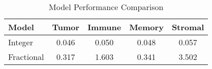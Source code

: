 \begin{table}[h!]
\centering
\caption{Model Performance Comparison}
\label{tab:performance}
\begin{tabular}{|l|c|c|c|c|}
\hline
Model & Tumor & Immune & Memory & Stromal \\
\hline
Integer & 0.046 & 0.050 & 0.048 & 0.057 \\
Fractional & 0.317 & 1.603 & 0.341 & 3.502 \\
\hline
\end{tabular}
\end{table}
